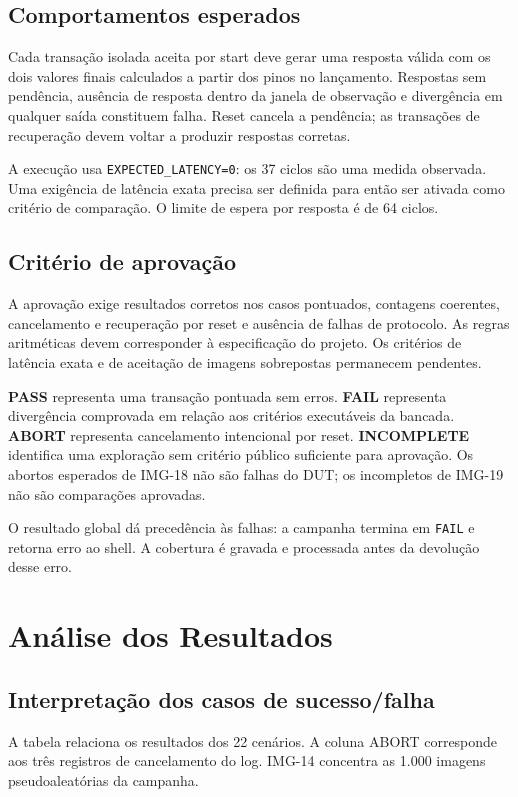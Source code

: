 \documentclass[12pt,a4paper]{article}
\begin{document}
\subsection{Comportamentos esperados}
Cada transação isolada aceita por start deve gerar uma resposta válida com os dois valores finais calculados a partir dos pinos no lançamento. Respostas sem pendência, ausência de resposta dentro da janela de observação e divergência em qualquer saída constituem falha. Reset cancela a pendência; as transações de recuperação devem voltar a produzir respostas corretas.

A execução usa \texttt{EXPECTED\_LATENCY=0}: os 37 ciclos são uma medida observada. Uma exigência de latência exata precisa ser definida para então ser ativada como critério de comparação. O limite de espera por resposta é de 64 ciclos.

\subsection{Critério de aprovação}
A aprovação exige resultados corretos nos casos pontuados, contagens coerentes, cancelamento e recuperação por reset e ausência de falhas de protocolo. As regras aritméticas devem corresponder à especificação do projeto. Os critérios de latência exata e de aceitação de imagens sobrepostas permanecem pendentes.

\textbf{PASS} representa uma transação pontuada sem erros. \textbf{FAIL} representa divergência comprovada em relação aos critérios executáveis da bancada. \textbf{ABORT} representa cancelamento intencional por reset. \textbf{INCOMPLETE} identifica uma exploração sem critério público suficiente para aprovação. Os abortos esperados de IMG-18 não são falhas do DUT; os incompletos de IMG-19 não são comparações aprovadas.

O resultado global dá precedência às falhas: a campanha termina em \texttt{FAIL} e retorna erro ao shell. A cobertura é gravada e processada antes da devolução desse erro.

\section{Análise dos Resultados}
\subsection{Interpretação dos casos de sucesso/falha}
A tabela relaciona os resultados dos 22 cenários. A coluna ABORT corresponde aos três registros de cancelamento do log. IMG-14 concentra as 1.000 imagens pseudoaleatórias da campanha.
\end{document}
